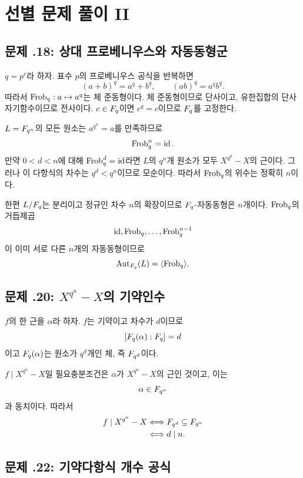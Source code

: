 \section{선별 문제 풀이 II}
\label{sec:finite-field-solutions-b}

\subsection*{문제 \thechapter.18: 상대 프로베니우스와 자동동형군}

\begin{solution}
$q=p^r$라 하자. 표수 $p$의 프로베니우스 공식을 반복하면
\[
  (a+b)^q=a^q+b^q,
  \qquad
  (ab)^q=a^qb^q.
\]
따라서 $\operatorname{Frob}_q:a\mapsto a^q$는 체 준동형이다. 체 준동형이므로 단사이고, 유한집합의 단사 자기함수이므로 전사이다. $c\in F_q$이면 $c^q=c$이므로 $F_q$를 고정한다.

$L=F_{q^n}$의 모든 원소는 $a^{q^n}=a$를 만족하므로
\[
  \operatorname{Frob}_q^n=\operatorname{id}.
\]
만약 $0<d<n$에 대해 $\operatorname{Frob}_q^d=\operatorname{id}$라면 $L$의 $q^n$개 원소가 모두 $X^{q^d}-X$의 근이다. 그러나 이 다항식의 차수는 $q^d<q^n$이므로 모순이다. 따라서 $\operatorname{Frob}_q$의 위수는 정확히 $n$이다.

한편 $L/F_q$는 분리이고 정규인 차수 $n$의 확장이므로 $F_q$-자동동형은 $n$개이다. $\operatorname{Frob}_q$의 거듭제곱
\[
  \operatorname{id},\operatorname{Frob}_q,\dots,\operatorname{Frob}_q^{n-1}
\]
이 이미 서로 다른 $n$개의 자동동형이므로
\[
  \operatorname{Aut}_{F_q}(L)=\langle\operatorname{Frob}_q\rangle.
\]
\end{solution}

\subsection*{문제 \thechapter.20: $X^{q^n}-X$의 기약인수}

\begin{solution}
$f$의 한 근을 $\alpha$라 하자. $f$는 기약이고 차수가 $d$이므로
\[
  [F_q(\alpha):F_q]=d
\]
이고 $F_q(\alpha)$는 원소가 $q^d$개인 체, 즉 $F_{q^d}$이다.

$f\mid X^{q^n}-X$일 필요충분조건은 $\alpha$가 $X^{q^n}-X$의 근인 것이고, 이는
\[
  \alpha\in F_{q^n}
\]
과 동치이다. 따라서
\[
\begin{aligned}
 f\mid X^{q^n}-X
 &\Longleftrightarrow F_{q^d}\subseteq F_{q^n}\\
 &\Longleftrightarrow d\mid n.
\end{aligned}
\]
\end{solution}

\subsection*{문제 \thechapter.22: 기약다항식 개수 공식}

